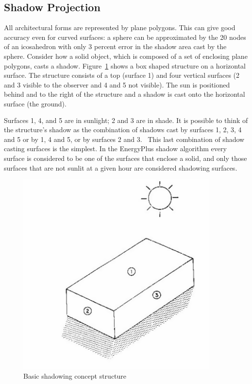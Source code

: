 \subsection{Shadow Projection}\label{shadow-projection}

All architectural forms are represented by plane polygons. This can give good accuracy even for curved surfaces: a sphere can be approximated by the 20 nodes of an icosahedron with only 3 percent error in the shadow area cast by the sphere. Consider how a solid object, which is composed of a set of enclosing plane polygons, casts a shadow. Figure~\ref{fig:basic-shadowing-concept-structure} shows a box shaped structure on a horizontal surface. The structure consists of a top (surface 1) and four vertical surfaces (2 and 3 visible to the observer and 4 and 5 not visible). The sun is positioned behind and to the right of the structure and a shadow is cast onto the horizontal surface (the ground).

Surfaces 1, 4, and 5 are in sunlight; 2 and 3 are in shade. It is possible to think of the structure's shadow as the combination of shadows cast by surfaces 1, 2, 3, 4 and 5 or by 1, 4 and 5, or by surfaces 2 and 3.~ This last combination of shadow casting surfaces is the simplest. In the EnergyPlus shadow algorithm every surface is considered to be one of the surfaces that enclose a solid, and only those surfaces that are not sunlit at a given hour are considered shadowing surfaces.

\begin{figure}[hbtp] %
\centering
\includegraphics[width=0.9\textwidth, height=0.9\textheight, keepaspectratio=true]{media/image622.png}
\caption{  Basic shadowing concept structure \protect \label{fig:basic-shadowing-concept-structure}}
\end{figure}

